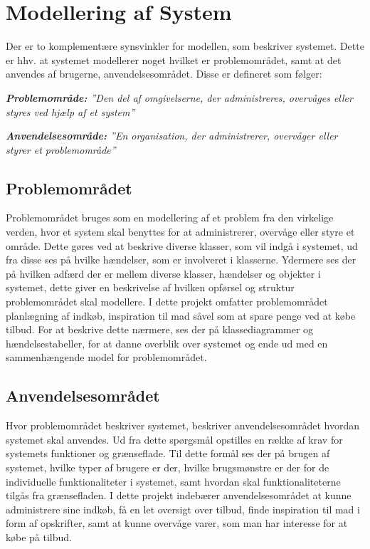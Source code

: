 \section{Modellering af System}
Der er to komplementære synsvinkler for modellen, som beskriver systemet. 
Dette er hhv. at systemet modellerer noget hvilket er problemområdet, samt at det anvendes af brugerne, anvendelsesområdet. 
Disse er defineret som følger:

\textit{\textbf{Problemområde:} ''Den del af omgivelserne, der administreres, overvåges eller styres ved hjælp af et system''}

\textit{\textbf{Anvendelsesområde:} ''En organisation, der administrerer, overvåger eller styrer et problemområde''}\citep{OOA&D2001}
\subsection{Problemområdet}
Problemområdet bruges som en modellering af et problem fra den virkelige verden, hvor et system skal benyttes for at administrerer, overvåge eller styre et område. 
Dette gøres ved at beskrive diverse klasser, som vil indgå i systemet, ud fra disse ses på hvilke hændelser, som er involveret i klasserne.
Ydermere ses der på hvilken adfærd der er mellem diverse klasser, hændelser og objekter i systemet, dette giver en beskrivelse af hvilken opførsel og struktur problemområdet skal modellere.
I dette projekt omfatter problemområdet planlægning af indkøb, inspiration til mad såvel som at spare penge ved at købe tilbud.
For at beskrive dette nærmere, ses der på klassediagrammer og hændelsestabeller, for at danne overblik over systemet og ende ud med en sammenhængende model for problemområdet.
\subsection{Anvendelsesområdet}
Hvor problemområdet beskriver systemet, beskriver anvendelsesområdet hvordan systemet skal anvendes.
Ud fra dette spørgsmål opstilles en række af krav for systemets funktioner og grænseflade.
Til dette formål ses der på brugen af systemet, hvilke typer af brugere er der, hvilke brugsmønstre er der for de individuelle funktionaliteter i systemet, samt hvordan skal funktionaliteterne tilgås fra grænsefladen.
I dette projekt indebærer anvendelsesområdet at kunne administrere sine indkøb, få en let oversigt over tilbud, finde inspiration til mad i form af opskrifter, samt at kunne overvåge varer, som man har interesse for at købe på tilbud.

